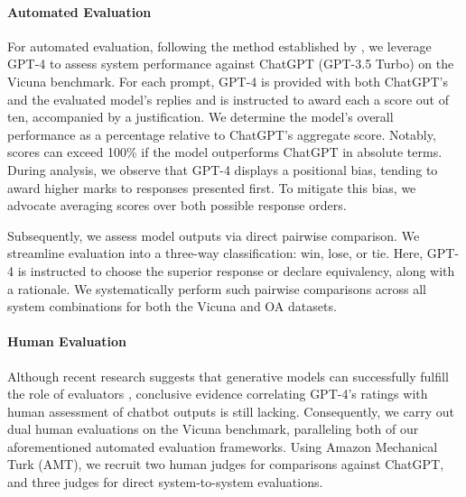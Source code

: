 \paragraph{Automated Evaluation} For automated evaluation, following the method established by \citet{vicuna2023}, we leverage GPT-4 to assess system performance against ChatGPT (GPT-3.5 Turbo) on the Vicuna benchmark. For each prompt, GPT-4 is provided with both ChatGPT’s and the evaluated model’s replies and is instructed to award each a score out of ten, accompanied by a justification. We determine the model’s overall performance as a percentage relative to ChatGPT’s aggregate score. Notably, scores can exceed 100\% if the model outperforms ChatGPT in absolute terms. During analysis, we observe that GPT-4 displays a positional bias, tending to award higher marks to responses presented first. To mitigate this bias, we advocate averaging scores over both possible response orders.

Subsequently, we assess model outputs via direct pairwise comparison. We streamline evaluation into a three-way classification: win, lose, or tie. Here, GPT-4 is instructed to choose the superior response or declare equivalency, along with a rationale. We systematically perform such pairwise comparisons across all system combinations for both the Vicuna and OA datasets.

\paragraph{Human Evaluation} Although recent research suggests that generative models can successfully fulfill the role of evaluators \citep{fu2023gptscore}, conclusive evidence correlating GPT-4’s ratings with human assessment of chatbot outputs is still lacking. Consequently, we carry out dual human evaluations on the Vicuna benchmark, paralleling both of our aforementioned automated evaluation frameworks. Using Amazon Mechanical Turk (AMT), we recruit two human judges for comparisons against ChatGPT, and three judges for direct system-to-system evaluations.

